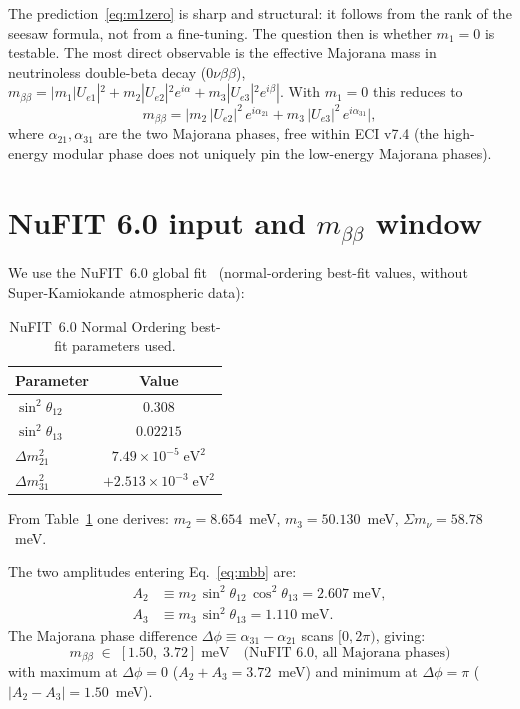 \documentclass[aps,prl,twocolumn,showpacs,superscriptaddress]{revtex4-2}
\newcommand{\mbb}{m_{\beta\beta}}
\begin{document}
The prediction~\eqref{eq:m1zero} is sharp and structural: it
follows from the rank of the seesaw formula, not from a
fine-tuning.  The question then is whether $m_1 = 0$ is testable.
The most direct observable is the effective Majorana mass in
neutrinoless double-beta decay ($0\nu\beta\beta$),
$\mbb = |m_1 |U_{e1}|^2 + m_2 |U_{e2}|^2 e^{i\alpha}
        + m_3 |U_{e3}|^2 e^{i\beta}|$.
With $m_1 = 0$ this reduces to
\begin{equation}
  \mbb = \bigl| m_2\,|U_{e2}|^2\,e^{i\alpha_{21}}
              + m_3\,|U_{e3}|^2\,e^{i\alpha_{31}}\bigr|,
  \label{eq:mbb}
\end{equation}
where $\alpha_{21},\alpha_{31}$ are the two Majorana phases, free
within ECI v7.4 (the high-energy modular phase does not uniquely
pin the low-energy Majorana phases).

\section{NuFIT 6.0 input and $\mbb$ window}
\label{sec:nufit}

We use the NuFIT~6.0 global fit~\cite{NuFIT60} (normal-ordering
best-fit values, without Super-Kamiokande atmospheric data):

\begin{table}[h]
\centering
\caption{NuFIT~6.0 Normal Ordering best-fit parameters used.}
\label{tab:nufit}
\begin{tabular}{lc}
\toprule
Parameter & Value \\
\midrule
$\sin^2\theta_{12}$ & $0.308$ \\
$\sin^2\theta_{13}$ & $0.02215$ \\
$\Delta m^2_{21}$   & $7.49\times10^{-5}\;\mathrm{eV}^2$ \\
$\Delta m^2_{31}$   & $+2.513\times10^{-3}\;\mathrm{eV}^2$ \\
\bottomrule
\end{tabular}
\end{table}

From Table~\ref{tab:nufit} one derives:
$m_2 = 8.654$~meV, $m_3 = 50.130$~meV,
$\Sigma m_\nu = 58.78$~meV.

The two amplitudes entering Eq.~\eqref{eq:mbb} are:
\begin{align}
  A_2 &\equiv m_2\,\sin^2\theta_{12}\,\cos^2\theta_{13}
       = 2.607\;\text{meV}, \label{eq:A2}\\
  A_3 &\equiv m_3\,\sin^2\theta_{13}
       = 1.110\;\text{meV}. \label{eq:A3}
\end{align}
The Majorana phase difference $\Delta\phi\equiv\alpha_{31}-\alpha_{21}$
scans $[0,2\pi)$, giving:
\begin{equation}
\boxed{
  \mbb \;\in\; [1.50,\;3.72]\;\text{meV}
  \quad\text{(NuFIT 6.0, all Majorana phases)}
}
\label{eq:mbb_range}
\end{equation}
with maximum at $\Delta\phi = 0$ ($A_2 + A_3 = 3.72$~meV) and
minimum at $\Delta\phi = \pi$ ($|A_2 - A_3| = 1.50$~meV).
\end{document}
